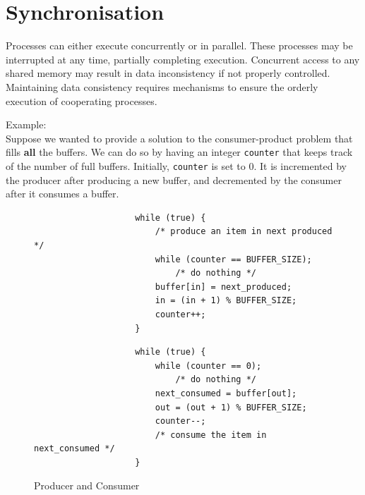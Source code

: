 \documentclass{book/custombook}
\begin{document}
    \chapter{Synchronisation}
        Processes can either execute concurrently or in parallel. These processes may be 
        interrupted at any time, partially completing execution.
        Concurrent access to any shared memory may result in data inconsistency if not properly
        controlled.\\
        Maintaining data consistency requires mechanisms to ensure the orderly execution of 
        cooperating processes.

        \hangindent=1cm Example: \\Suppose we wanted to provide a solution to the consumer-product problem that
        fills \textbf{all} the buffers. We can do so by having an integer \texttt{counter} that keeps
        track of the number of full buffers. Initially, \texttt{counter} is set to 0. It is incremented
        by the producer after producing a new buffer, and decremented by the consumer after it consumes
        a buffer.
        \begin{figure}[H]
            \centering
            \begin{minipage}{0.49\textwidth}
                \begin{verbatim}
                    while (true) {
                        /* produce an item in next produced */
                        while (counter == BUFFER_SIZE);
                            /* do nothing */
                        buffer[in] = next_produced;
                        in = (in + 1) % BUFFER_SIZE;
                        counter++;
                    }
                \end{verbatim}
            \end{minipage}
            \begin{minipage}{0.49\textwidth}
                \begin{verbatim}
                    while (true) {
                        while (counter == 0);
                            /* do nothing */
                        next_consumed = buffer[out];
                        out = (out + 1) % BUFFER_SIZE;
                        counter--;
                        /* consume the item in next_consumed */
                    }
                \end{verbatim}
            \end{minipage}
            \caption{Producer and Consumer}
        \end{figure}
\end{document}
